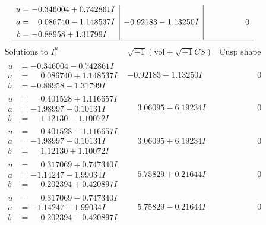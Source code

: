 \documentclass[1p]{elsarticle_modified}
\theoremstyle{definition}
\newcommand{\I}{\sqrt{-1}}
\begin{document}
$$\begin{array}{c|c|c}
\begin{aligned}
u &= -0.346004 + 0.742861 I \\
a &= \phantom{-}0.086740 - 1.148537 I \\
b &= -0.88958 + 1.31799 I\end{aligned}
 & -0.92183 - 1.13250 I & \phantom{-0.000000 } 0\\
 \hline 
 \end{array}$$\newpage$$\begin{array}{c|c|c}  
\text{Solutions to }I^u_{1}& \I (\text{vol} + \sqrt{-1}CS) & \text{Cusp shape}\\
 \hline 
\begin{aligned}
u &= -0.346004 - 0.742861 I \\
a &= \phantom{-}0.086740 + 1.148537 I \\
b &= -0.88958 - 1.31799 I\end{aligned}
 & -0.92183 + 1.13250 I & \phantom{-0.000000 } 0 \\ \hline\begin{aligned}
u &= \phantom{-}0.401528 + 1.116657 I \\
a &= -1.98997 - 0.10131 I \\
b &= \phantom{-}1.12130 - 1.10072 I\end{aligned}
 & \phantom{-}3.06095 - 6.19234 I & \phantom{-0.000000 } 0 \\ \hline\begin{aligned}
u &= \phantom{-}0.401528 - 1.116657 I \\
a &= -1.98997 + 0.10131 I \\
b &= \phantom{-}1.12130 + 1.10072 I\end{aligned}
 & \phantom{-}3.06095 + 6.19234 I & \phantom{-0.000000 } 0 \\ \hline\begin{aligned}
u &= \phantom{-}0.317069 + 0.747340 I \\
a &= -1.14247 - 1.99034 I \\
b &= \phantom{-}0.202394 + 0.420897 I\end{aligned}
 & \phantom{-}5.75829 + 0.21644 I & \phantom{-0.000000 } 0 \\ \hline\begin{aligned}
u &= \phantom{-}0.317069 - 0.747340 I \\
a &= -1.14247 + 1.99034 I \\
b &= \phantom{-}0.202394 - 0.420897 I\end{aligned}
 & \phantom{-}5.75829 - 0.21644 I & \phantom{-0.000000 } 0 \\ \hline\begin{aligned}

\end{aligned}
\end{array}$$
\end{document}
